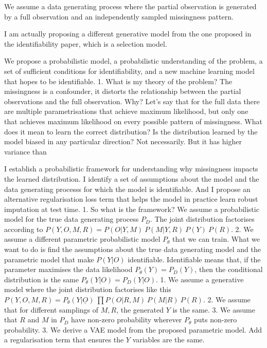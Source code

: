 \documentclass[a4paper,12pt,twoside,openright]{article}
\begin{document}
We assume a data generating process where the partial observation is generated by a full observation and an independently sampled missingness pattern.

I am actually proposing a different generative model from the one proposed in the identifiability paper, which is a selection model.

We propose a probabilistic model, a probabilistic understanding of the problem, a set of sufficient conditions for identifiability, and a new machine learning model that hopes to be identifiable.
   1. What is my theory of the problem? The missingness is a confounder, it distorts the relationship between the partial observations and the full observation. Why? Let's say that for the full data there are multiple parametrisations that achieve maximum likelihood, but only one that achieves maximum likelihood on every possible pattern of missingness. What does it mean to learn the correct distribution? Is the distribution learned by the model biased in any particular direction? Not necessarily. But it has higher variance than

I establish a probabilistic framework for understanding why missingness impacts the learned distribution. I identify a set of assumptions about the model and the data generating processs for which the model is identifiable. And I propose an alternative regularisation loss term that helps the model in practice learn robust imputation at test time.
    1. So what is the framework? We assume a probabilistic model for the true data generating process $P_D$. The joint distribution factorises according to $P(Y, O, M, R) = P(O | Y, M) ~ P(M | Y, R) ~ P(Y) ~ P(R)$.
    2. We assume a different parametric probabilistic model $P_\theta$ that we can train. What we want to do is find the assumptions about the true data generating model and the parametric model that make $P(Y | O)$ identifiable. Identifiable means that, if the parameter maximises the data likelihood $P_\theta (Y) = P_D (Y)$, then the conditional distribution is the same $P_\theta (Y | O) = P_D (Y | O)$.
        1. We assume a generative model where the joint distribution factorises like this $P (Y, O, M, R) = P_\theta (Y | \underline{O}) ~ \prod P(O | R, M) ~ P(M | R) ~ P(R)$.
        2. We assume that for different samplings of $M, R$, the generated $Y$ is the same.
        3. We assume that $R$ and $M$ in $P_D$ have non-zero probability wherever $P_\theta$ puts non-zero probability.
    3. We derive a VAE model from the proposed parametric model. Add a regularisation term that ensures the $Y$ variables are the same. 
\end{document}

